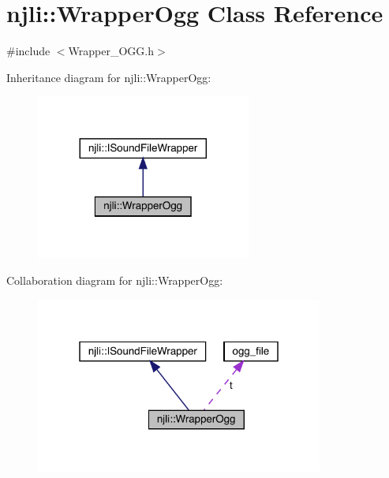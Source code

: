 \hypertarget{classnjli_1_1_wrapper_ogg}{}\section{njli\+:\+:Wrapper\+Ogg Class Reference}
\label{classnjli_1_1_wrapper_ogg}


{\ttfamily \#include $<$Wrapper\+\_\+\+O\+G\+G.\+h$>$}



Inheritance diagram for njli\+:\+:Wrapper\+Ogg\+:\nopagebreak
\begin{figure}[H]
\begin{center}
\leavevmode
\includegraphics[width=200pt]{classnjli_1_1_wrapper_ogg__inherit__graph}
\end{center}
\end{figure}


Collaboration diagram for njli\+:\+:Wrapper\+Ogg\+:\nopagebreak
\begin{figure}[H]
\begin{center}
\leavevmode
\includegraphics[width=268pt]{classnjli_1_1_wrapper_ogg__coll__graph}
\end{center}
\end{figure}
